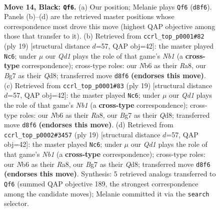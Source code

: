 \documentclass[11pt]{article}
\begin{document}
\clearpage

\begin{figure}[p]\centering
\begin{subfigure}{0.46\textwidth}\centering
\resizebox{\linewidth}{!}{%
\newchessgame
\chessboard[
  setfen={rnbqr1k1/pp3pbp/1n4p1/3p4/3P4/1B5P/PP3PP1/RNBQNRK1 b - - 0 14},
  showmover=false,
  pgfstyle=straightmove, color=movearrow, markmove={d8-f6}
]}
\caption{}
\end{subfigure}\hfill
\begin{subfigure}{0.46\textwidth}\centering
\resizebox{\linewidth}{!}{%
\newchessgame
\chessboard[
  setfen={rnbq1rk1/ppp1p1bp/1n4p1/8/3PN3/4BN1P/PP3PP1/R2QKB1R b KQ - 0 10},
  showmover=false,
  pgfstyle=straightmove, color=movearrow, markmove={b8-c6}
]}
\caption{}
\end{subfigure}
\\[4pt]
\begin{subfigure}{0.46\textwidth}\centering
\resizebox{\linewidth}{!}{%
\newchessgame
\chessboard[
  setfen={rnbq1rk1/ppp1p1bp/1n4p1/8/3PN3/4BN1P/PP3PP1/R2QKB1R b KQ - 0 10},
  showmover=false,
  pgfstyle=straightmove, color=movearrow, markmove={b8-c6}
]}
\caption{}
\end{subfigure}\hfill
\begin{subfigure}{0.46\textwidth}\centering
\resizebox{\linewidth}{!}{%
\newchessgame
\chessboard[
  setfen={rnbq1rk1/ppp1p1bp/1n4p1/8/3PN3/4BN1P/PP3PP1/R2QKB1R b KQ - 0 10},
  showmover=false,
  pgfstyle=straightmove, color=movearrow, markmove={b8-c6}
]}
\caption{}
\end{subfigure}
\caption{\textbf{Move 14, Black: \texttt{Qf6}.} (a) Our position; Melanie plays \texttt{Qf6} (\texttt{d8f6}). Panels (b)--(d) are the retrieved master positions whose correspondence most drove this move (highest QAP objective among those that transfer to it). (b) Retrieved from \texttt{ccrl\_top\_p0001\#82} (ply 19) [structural distance $d$=57, QAP obj=42]: the master played \texttt{Nc6}; under $\mu$ our \emph{Qd1} plays the role of that game's \emph{Nb1} (a \textbf{cross-type} correspondence); cross-type roles: our \emph{N}b6 as their \emph{R}a8, our \emph{B}g7 as their \emph{Q}d8; transferred move \texttt{d8f6} \textbf{(endorses this move)}. (c) Retrieved from \texttt{ccrl\_top\_p0001\#83} (ply 19) [structural distance $d$=57, QAP obj=42]: the master played \texttt{Nc6}; under $\mu$ our \emph{Qd1} plays the role of that game's \emph{Nb1} (a \textbf{cross-type} correspondence); cross-type roles: our \emph{N}b6 as their \emph{R}a8, our \emph{B}g7 as their \emph{Q}d8; transferred move \texttt{d8f6} \textbf{(endorses this move)}. (d) Retrieved from \texttt{ccrl\_top\_p0002\#3457} (ply 19) [structural distance $d$=57, QAP obj=42]: the master played \texttt{Nc6}; under $\mu$ our \emph{Qd1} plays the role of that game's \emph{Nb1} (a \textbf{cross-type} correspondence); cross-type roles: our \emph{N}b6 as their \emph{R}a8, our \emph{B}g7 as their \emph{Q}d8; transferred move \texttt{d8f6} \textbf{(endorses this move)}. Synthesis: 5 retrieved analogs transferred to \texttt{Qf6} (summed QAP objective 189, the strongest correspondence among the candidate moves); Melanie committed it via the \texttt{search} selector.}
\label{fig:thought-m27}
\end{figure}
\end{document}
